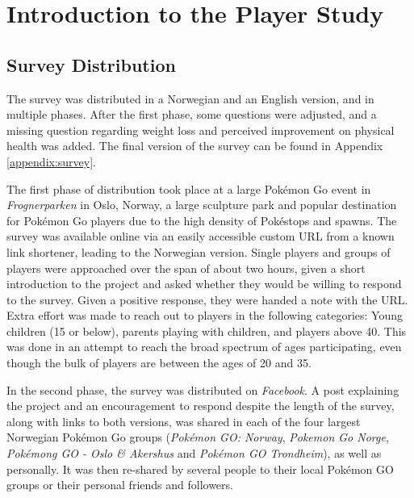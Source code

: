 
\chapter{Introduction to the Player Study}

\label{chapter:player-study-introduction}

\section{Survey Distribution}

The survey was distributed in a Norwegian and an English version, and in multiple phases. After the first phase, some questions were adjusted, and a missing question regarding weight loss and perceived improvement on physical health was added. The final version of the survey can be found in Appendix \ref{appendix:survey}.

The first phase of distribution took place at a large Pokémon Go event in \emph{Frognerparken} in Oslo, Norway, a large sculpture park and popular destination for Pokémon Go players due to the high density of Pokéstops and spawns. The survey was available online via an easily accessible custom URL from a known link shortener, leading to the Norwegian version. Single players and groups of players were approached over the span of about two hours, given a short introduction to the project and asked whether they would be willing to respond to the survey. Given a positive response, they were handed a note with the URL. Extra effort was made to reach out to players in the following categories: Young children (15 or below), parents playing with children, and players above 40. This was done in an attempt to reach the broad spectrum of ages participating, even though the bulk of players are between the ages of 20 and 35. 

In the second phase, the survey was distributed on \emph{Facebook}. A post explaining the project and an encouragement to respond despite the length of the survey, along with links to both versions, was shared in each of the four largest Norwegian Pokémon Go groups (\emph{Pokémon GO: Norway}, \emph{Pokemon Go Norge}, \emph{Pokémong GO - Oslo \& Akershus} and \emph{Pokémon GO Trondheim}), as well as personally. It was then re-shared by several people to their local Pokémon GO groups or their personal friends and followers. 


